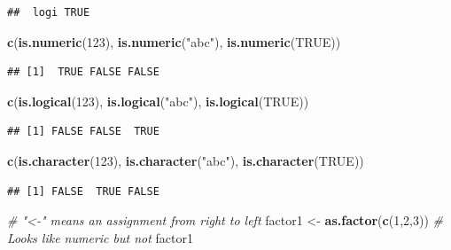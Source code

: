 \documentclass[]{book}
\newenvironment{Shaded}{\begin{snugshade}}{\end{snugshade}}
\newcommand{\KeywordTok}[1]{\textcolor[rgb]{0.13,0.29,0.53}{\textbf{{#1}}}}
\newcommand{\DecValTok}[1]{\textcolor[rgb]{0.00,0.00,0.81}{{#1}}}
\newcommand{\StringTok}[1]{\textcolor[rgb]{0.31,0.60,0.02}{{#1}}}
\newcommand{\CommentTok}[1]{\textcolor[rgb]{0.56,0.35,0.01}{\textit{{#1}}}}
\newcommand{\OtherTok}[1]{\textcolor[rgb]{0.56,0.35,0.01}{{#1}}}
\newcommand{\NormalTok}[1]{{#1}}
\theoremstyle{definition}
\theoremstyle{definition}
\theoremstyle{remark}
\begin{document}
\begin{verbatim}
##  logi TRUE
\end{verbatim}

\begin{Shaded}
\begin{Highlighting}[]
\KeywordTok{c}\NormalTok{(}\KeywordTok{is.numeric}\NormalTok{(}\DecValTok{123}\NormalTok{), }\KeywordTok{is.numeric}\NormalTok{(}\StringTok{"abc"}\NormalTok{), }\KeywordTok{is.numeric}\NormalTok{(}\OtherTok{TRUE}\NormalTok{))}
\end{Highlighting}
\end{Shaded}

\begin{verbatim}
## [1]  TRUE FALSE FALSE
\end{verbatim}

\begin{Shaded}
\begin{Highlighting}[]
\KeywordTok{c}\NormalTok{(}\KeywordTok{is.logical}\NormalTok{(}\DecValTok{123}\NormalTok{), }\KeywordTok{is.logical}\NormalTok{(}\StringTok{"abc"}\NormalTok{), }\KeywordTok{is.logical}\NormalTok{(}\OtherTok{TRUE}\NormalTok{))}
\end{Highlighting}
\end{Shaded}

\begin{verbatim}
## [1] FALSE FALSE  TRUE
\end{verbatim}

\begin{Shaded}
\begin{Highlighting}[]
\KeywordTok{c}\NormalTok{(}\KeywordTok{is.character}\NormalTok{(}\DecValTok{123}\NormalTok{), }\KeywordTok{is.character}\NormalTok{(}\StringTok{"abc"}\NormalTok{), }\KeywordTok{is.character}\NormalTok{(}\OtherTok{TRUE}\NormalTok{))}
\end{Highlighting}
\end{Shaded}

\begin{verbatim}
## [1] FALSE  TRUE FALSE
\end{verbatim}

\begin{Shaded}
\begin{Highlighting}[]
\CommentTok{# "<-" means an assignment from right to left}
\NormalTok{factor1 <-}\StringTok{ }\KeywordTok{as.factor}\NormalTok{(}\KeywordTok{c}\NormalTok{(}\DecValTok{1}\NormalTok{,}\DecValTok{2}\NormalTok{,}\DecValTok{3}\NormalTok{)) }\CommentTok{# Looks like numeric but not}
\NormalTok{factor1}
\end{Highlighting}
\end{Shaded}
\end{document}
